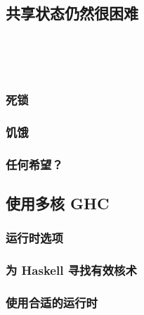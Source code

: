 \documentclass[./main.tex]{subfiles}
\begin{document}
\subsection*{共享状态仍然很困难}

%

\begin{lstlisting}[language=Haskell]

\end{lstlisting}



\begin{lstlisting}[language=Haskell]

\end{lstlisting}



\begin{lstlisting}[language=Haskell]

\end{lstlisting}



\begin{lstlisting}[language=Haskell]

\end{lstlisting}



\begin{lstlisting}[language=Haskell]

\end{lstlisting}

\subsubsection*{死锁}

\subsubsection*{饥饿}

\subsubsection*{任何希望？}

\subsection*{使用多核 GHC}

\subsubsection*{运行时选项}

\subsubsection*{为 Haskell 寻找有效核术}

\subsubsection*{使用合适的运行时}
\end{document}
